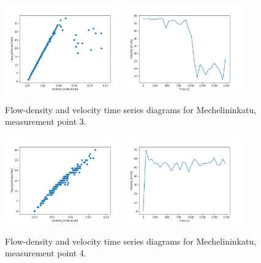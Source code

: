 \documentclass[english, 12pt, a4paper, elec, utf8, pdfa, online]{aaltothesis}
\begin{document}
\clearpage
\begin{figure}[ht!]
    \centering
    \includegraphics[width=0.45\textwidth]{graphs/Mechelininkatu_3_flw_dns.png}
    \includegraphics[width=0.45\textwidth]{graphs/Mechelininkatu_3_spd_time_6.png}
    \caption{Flow-density and velocity time series diagrams for Mechelininkatu, measurement point 3.}
\end{figure}
\begin{figure}[ht!]
    \centering
    \includegraphics[width=0.45\textwidth]{graphs/Mechelininkatu_4_flw_dns.png}
    \includegraphics[width=0.45\textwidth]{graphs/Mechelininkatu_4_spd_time_6.png}
    \caption{Flow-density and velocity time series diagrams for Mechelininkatu, measurement point 4.}
\end{figure}
\end{document}
